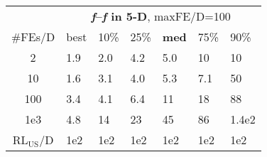 \begin{tabular}{c|llllll}
 & \multicolumn{6}{|c}{\textbf{\textit{f}\raisebox{-0.35ex}{1}--\textit{f}\raisebox{-0.35ex}{24} in 5-D}, maxFE/D=100}\\
\#FEs/D & best & 10\% & 25\% & \textbf{med} & 75\% & 90\%\\
2 & \hspace*{1ex}1.9 & \hspace*{1ex}2.0 & \hspace*{1ex}4.2 & \hspace*{1ex}5.0 & 10 & 10\\
10 & \hspace*{1ex}1.6 & \hspace*{1ex}3.1 & \hspace*{1ex}4.0 & \hspace*{1ex}5.3 & \hspace*{1ex}7.1 & 50\\
100 & \hspace*{1ex}3.4 & \hspace*{1ex}4.1 & \hspace*{1ex}6.4 & 11 & 18 & 88\\
1e3 & \hspace*{1ex}4.8 & 14 & 23 & 45 & 86 & 1.4e2\\
$\text{RL}_{\text{US}}$/D & 1e2 & 1e2 & 1e2 & 1e2 & 1e2 & 1e2
\end{tabular}
